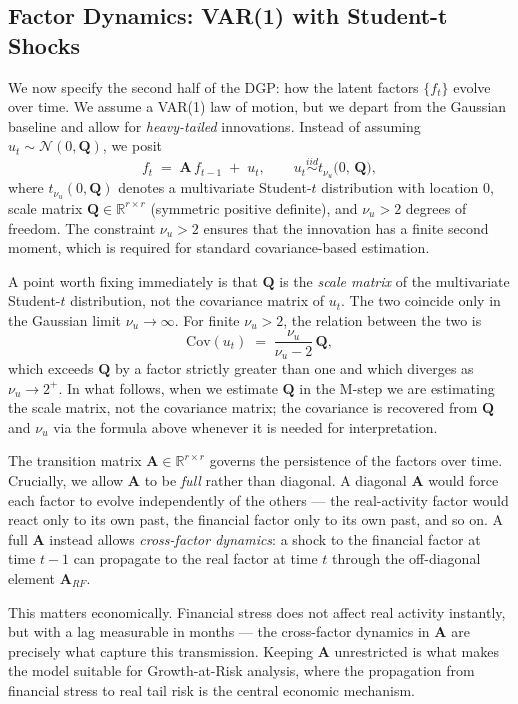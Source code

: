 \documentclass[11pt, a4paper, oneside]{article}
\newcommand{\mA}{\mathbf{A}}
\newcommand{\mQ}{\mathbf{Q}}
\begin{document}
\subsection{Factor Dynamics: VAR(1) with Student-t Shocks}

We now specify the second half of the DGP: how the latent factors
$\{f_t\}$ evolve over time. We assume a VAR(1) law of motion, but we
depart from the Gaussian baseline and allow for \emph{heavy-tailed}
innovations. Instead of assuming $u_t \sim \mathcal{N}(0, \mathbf{Q})$,
we posit
\begin{equation}
f_t \;=\; \mA\, f_{t-1} \;+\; u_t,
\qquad u_t \overset{iid}{\sim} t_{\nu_u}\!\big(0,\, \mathbf{Q}\big),
\label{eq:state}
\end{equation}
where $t_{\nu_u}(0, \mathbf{Q})$ denotes a multivariate Student-$t$
distribution with location $0$, scale matrix
$\mathbf{Q} \in \mathbb{R}^{r \times r}$ (symmetric positive definite),
and $\nu_u > 2$ degrees of freedom. The constraint $\nu_u > 2$ ensures
that the innovation has a finite second moment, which is required for
standard covariance-based estimation.

A point worth fixing immediately is that $\mQ$ is the \emph{scale
matrix} of the multivariate Student-$t$ distribution, not the
covariance matrix of $u_t$. The two coincide only in the Gaussian
limit $\nu_u \to \infty$. For finite $\nu_u > 2$, the relation
between the two is
\[
\mathrm{Cov}(u_t) \;=\; \frac{\nu_u}{\nu_u - 2}\, \mQ,
\]
which exceeds $\mQ$ by a factor strictly greater than one and which
diverges as $\nu_u \to 2^+$. In what follows, when we estimate $\mQ$
in the M-step we are estimating the scale matrix, not the covariance
matrix; the covariance is recovered from $\mQ$ and $\nu_u$ via the
formula above whenever it is needed for interpretation.

The transition matrix $\mathbf{A} \in \mathbb{R}^{r \times r}$ governs
the persistence of the factors over time. Crucially, we allow
$\mathbf{A}$ to be \emph{full} rather than diagonal. A diagonal
$\mathbf{A}$ would force each factor to evolve independently of the
others — the real-activity factor would react only to its own past,
the financial factor only to its own past, and so on. A full
$\mathbf{A}$ instead allows \emph{cross-factor dynamics}: a shock to
the financial factor at time $t-1$ can propagate to the real factor at
time $t$ through the off-diagonal element $\mathbf{A}_{RF}$.

This matters economically. Financial stress does not affect real
activity instantly, but with a lag measurable in months — the
cross-factor dynamics in $\mathbf{A}$ are precisely what capture this
transmission. Keeping $\mathbf{A}$ unrestricted is what makes the
model suitable for Growth-at-Risk analysis, where the propagation from
financial stress to real tail risk is the central economic
mechanism.
\end{document}
